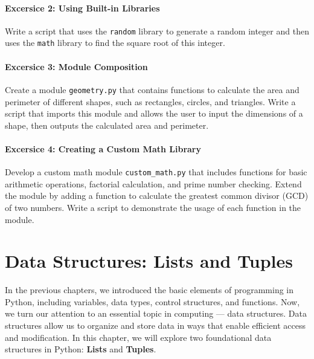 \documentclass[
  letterpaper,
  DIV=11,
  numbers=noendperiod]{scrreprt}
\begin{document}
\hypertarget{excersice-2-using-built-in-libraries}{%
\subsubsection{Excersice 2: Using Built-in
Libraries}\label{excersice-2-using-built-in-libraries}}

Write a script that uses the \texttt{random} library to generate a
random integer and then uses the \texttt{math} library to find the
square root of this integer.

\hypertarget{excersice-3-module-composition}{%
\subsubsection{Excersice 3: Module
Composition}\label{excersice-3-module-composition}}

Create a module \texttt{geometry.py} that contains functions to
calculate the area and perimeter of different shapes, such as
rectangles, circles, and triangles. Write a script that imports this
module and allows the user to input the dimensions of a shape, then
outputs the calculated area and perimeter.

\hypertarget{excersice-4-creating-a-custom-math-library}{%
\subsubsection{Excersice 4: Creating a Custom Math
Library}\label{excersice-4-creating-a-custom-math-library}}

Develop a custom math module \texttt{custom\_math.py} that includes
functions for basic arithmetic operations, factorial calculation, and
prime number checking. Extend the module by adding a function to
calculate the greatest common divisor (GCD) of two numbers. Write a
script to demonstrate the usage of each function in the module.


\hypertarget{sec-data1}{%
\chapter{Data Structures: Lists and Tuples}\label{sec-data1}}

In the previous chapters, we introduced the basic elements of
programming in Python, including variables, data types, control
structures, and functions. Now, we turn our attention to an essential
topic in computing --- data structures. Data structures allow us to
organize and store data in ways that enable efficient access and
modification. In this chapter, we will explore two foundational data
structures in Python: \textbf{Lists} and \textbf{Tuples}.
\end{document}
